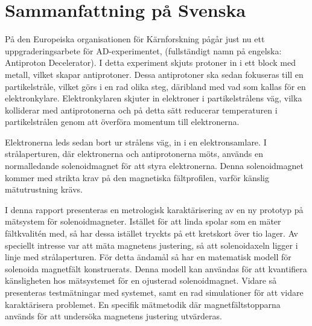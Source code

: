 \documentclass{UUThesisTemplate}
\begin{document}
\frontmatter
\frontmatterCS
\newpage
\section*{Sammanfattning på Svenska}
På den Europeiska organisationen för Kärnforskning pågår just
nu ett uppgraderingsarbete för AD-experimentet, (fullständigt
namn på engelska: Antiproton Decelerator). I detta experiment
skjuts protoner in i ett block med metall, vilket skapar 
antiprotoner. Dessa antiprotoner ska sedan fokuseras till
en partikelstråle, vilket görs i en rad olika steg, däribland
med vad som kallas för en elektronkylare. Elektronkylaren
skjuter in elektroner i partikelstrålens väg, vilka kolliderar
med antiprotonerna och på detta sätt reducerar temperaturen
i partikelstrålen genom att överföra momentum till elektronerna.

Elektronerna leds sedan bort ur strålens väg, in i en elektronsamlare.
I strålaperturen, där elektronerna och antiprotonerna möts, används
en normalledande solenoidmagnet för att styra elektronerna. Denna
solenoidmagnet kommer med strikta krav på den magnetiska fältprofilen,
varför känslig mätutrustning krävs.

I denna rapport presenteras en metrologisk karaktärisering av en
ny prototyp på mätsystem för solenoidmagneter. Istället för att linda spolar som en mäter
fältkvalitén med, så har dessa istället tryckts på ett kretskort över
tio lager. Av speciellt intresse var att mäta magnetens justering, så
att solenoidaxeln ligger i linje med strålaperturen. För detta ändamål
så har en matematisk modell för solenoida magnetfält konstruerats. Denna
modell kan användas för att kvantifiera känsligheten hos mätsystemet
för en ojusterad solenoidmagnet. Vidare så presenteras testmätningar
med systemet, samt en rad simulationer för att vidare karaktärisera problemet.
En specifik mätmetodik där magnetfältstopparna används för att undersöka 
magnetens justering utvärderas.


\dedication{Thanks to everyone at the TE-MSC-MM department for their warm and
inviting culture, and sharing all
their knowledge on magnetics. Thanks especially to my supervisors Carlo Petrone
and Mariano Pentella, who taught me everything you could want to know about
Italy.}
\end{document}
